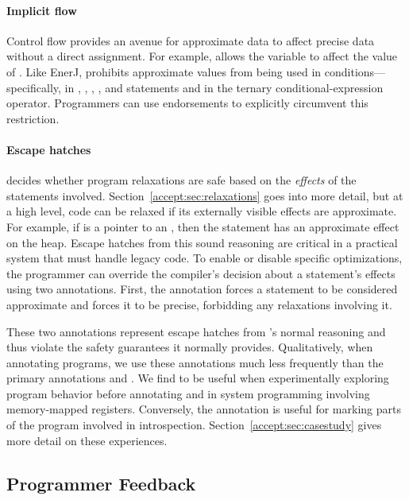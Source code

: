 \paragraph{Implicit flow}
Control flow provides an avenue for approximate data to affect precise data
without a direct assignment. For example,  allows the
variable  to affect the value of .
Like EnerJ, \sysname prohibits approximate values from being used in
conditions---specifically, in , , , , and
 statements and in the ternary conditional-expression operator.
Programmers can use endorsements to explicitly circumvent this restriction.

\paragraph{Escape hatches}
\sysname decides whether program relaxations are safe based on the
\emph{effects} of the statements involved. Section~\ref{accept:sec:relaxations} goes
into more detail, but at a high level, code can be relaxed if its externally
visible effects are approximate.  For example, if  is a pointer to
an , then the statement  has an approximate effect
on the heap.
Escape hatches from this sound reasoning are critical in a practical
system that must handle legacy code.
To enable or disable specific optimizations, the programmer can
override the compiler's decision about a statement's effects using two
annotations. First, the \annpermit annotation forces a statement to
be considered approximate
and \annforbid forces it to be precise, forbidding
any relaxations involving it.

These two annotations represent escape hatches from \sysname's normal
reasoning and thus violate the safety guarantees it normally provides.
%
Qualitatively, when annotating programs, we use these
annotations much less frequently than the primary annotations
 and . We find \annpermit to be
useful when experimentally exploring program behavior before annotating and in
system programming involving memory-mapped registers.  Conversely, the
\annforbid annotation is useful for marking parts of the program involved in
introspection. Section~\ref{accept:sec:casestudy} gives more detail on these
experiences.

\subsection{Programmer Feedback}
\label{accept:sec:feedback}

